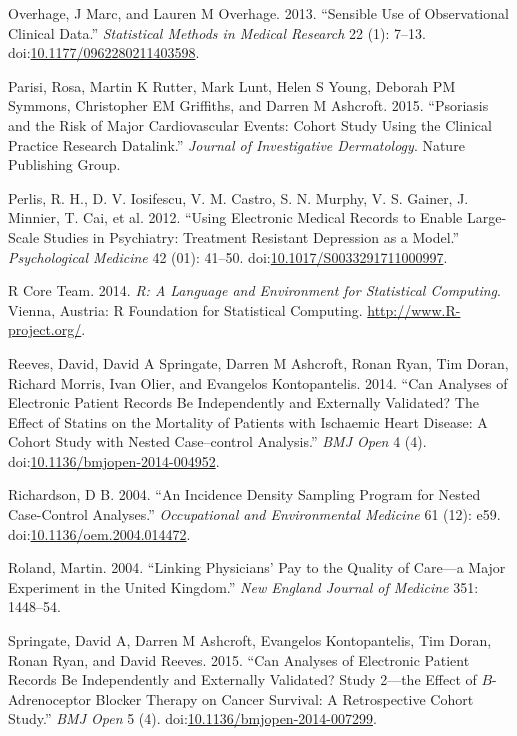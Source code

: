 \documentclass[]{article}
\begin{document}
Overhage, J Marc, and Lauren M Overhage. 2013. ``Sensible Use of
Observational Clinical Data.'' \emph{Statistical Methods in Medical
Research} 22 (1): 7--13.
doi:\href{http://dx.doi.org/10.1177/0962280211403598}{10.1177/0962280211403598}.

Parisi, Rosa, Martin K Rutter, Mark Lunt, Helen S Young, Deborah PM
Symmons, Christopher EM Griffiths, and Darren M Ashcroft. 2015.
``Psoriasis and the Risk of Major Cardiovascular Events: Cohort Study
Using the Clinical Practice Research Datalink.'' \emph{Journal of
Investigative Dermatology}. Nature Publishing Group.

Perlis, R. H., D. V. Iosifescu, V. M. Castro, S. N. Murphy, V. S.
Gainer, J. Minnier, T. Cai, et al. 2012. ``Using Electronic Medical
Records to Enable Large-Scale Studies in Psychiatry: Treatment Resistant
Depression as a Model.'' \emph{Psychological Medicine} 42 (01): 41--50.
doi:\href{http://dx.doi.org/10.1017/S0033291711000997}{10.1017/S0033291711000997}.

R Core Team. 2014. \emph{R: A Language and Environment for Statistical
Computing}. Vienna, Austria: R Foundation for Statistical Computing.
\url{http://www.R-project.org/}.

Reeves, David, David A Springate, Darren M Ashcroft, Ronan Ryan, Tim
Doran, Richard Morris, Ivan Olier, and Evangelos Kontopantelis. 2014.
``Can Analyses of Electronic Patient Records Be Independently and
Externally Validated? The Effect of Statins on the Mortality of Patients
with Ischaemic Heart Disease: A Cohort Study with Nested Case--control
Analysis.'' \emph{BMJ Open} 4 (4).
doi:\href{http://dx.doi.org/10.1136/bmjopen-2014-004952}{10.1136/bmjopen-2014-004952}.

Richardson, D B. 2004. ``An Incidence Density Sampling Program for
Nested Case-Control Analyses.'' \emph{Occupational and Environmental
Medicine} 61 (12): e59.
doi:\href{http://dx.doi.org/10.1136/oem.2004.014472}{10.1136/oem.2004.014472}.

Roland, Martin. 2004. ``Linking Physicians' Pay to the Quality of
Care---a Major Experiment in the United Kingdom.'' \emph{New England
Journal of Medicine} 351: 1448--54.

Springate, David A, Darren M Ashcroft, Evangelos Kontopantelis, Tim
Doran, Ronan Ryan, and David Reeves. 2015. ``Can Analyses of Electronic
Patient Records Be Independently and Externally Validated? Study 2---the
Effect of \(B\)-Adrenoceptor Blocker Therapy on Cancer Survival: A
Retrospective Cohort Study.'' \emph{BMJ Open} 5 (4).
doi:\href{http://dx.doi.org/10.1136/bmjopen-2014-007299}{10.1136/bmjopen-2014-007299}.
\end{document}
